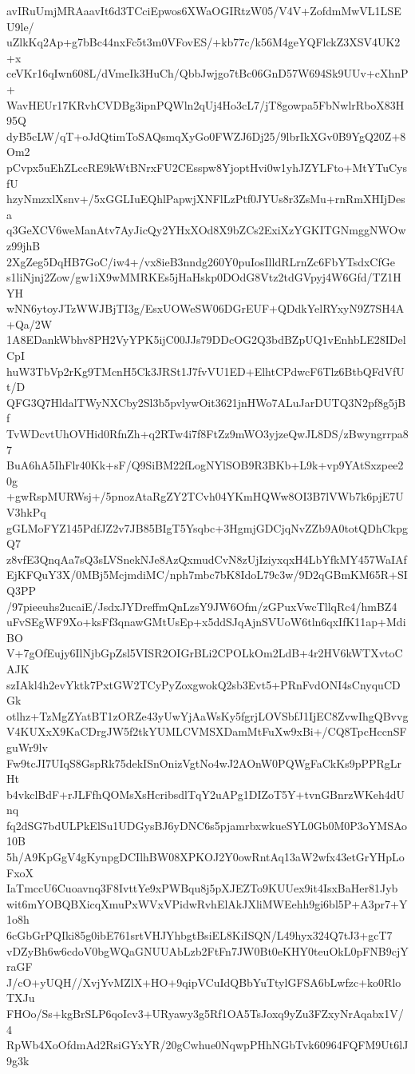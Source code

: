 avIRuUmjMRAaavIt6d3TCciEpwos6XWaOGIRtzW05/V4V+ZofdmMwVL1LSEU9le/
uZlkKq2Ap+g7bBc44nxFc5t3m0VFovES/+kb77c/k56M4geYQFlckZ3XSV4UK2+x
ceVKr16qIwn608L/dVmeIk3HuCh/QbbJwjgo7tBc06GnD57W694Sk9UUv+cXhnP+
WavHEUr17KRvhCVDBg3ipnPQWln2qUj4Ho3cL7/jT8gowpa5FbNwlrRboX83H95Q
dyB5cLW/qT+oJdQtimToSAQsmqXyGo0FWZJ6Dj25/9lbrIkXGv0B9YgQ20Z+8Om2
pCvpx5uEhZLccRE9kWtBNrxFU2CEsspw8YjoptHvi0w1yhJZYLFto+MtYTuCysfU
hzyNmzxlXsnv+/5xGGLIuEQhlPapwjXNFlLzPtf0JYUs8r3ZsMu+rnRmXHIjDesa
q3GeXCV6weManAtv7AyJicQy2YHxXOd8X9bZCs2ExiXzYGKITGNmggNWOwz99jhB
2XgZeg5DqHB7GoC/iw4+/vx8ieB3nndg260Y0puIosIlldRLrnZc6FbYTsdxCfGe
s1liNjnj2Zow/gw1iX9wMMRKEs5jHaHskp0DOdG8Vtz2tdGVpyj4W6Gfd/TZ1HYH
wNN6ytoyJTzWWJBjTI3g/EsxUOWeSW06DGrEUF+QDdkYelRYxyN9Z7SH4A+Qa/2W
1A8EDankWbhv8PH2VyYPK5ijC00JJs79DDcOG2Q3bdBZpUQ1vEnhbLE28IDelCpI
huW3TbVp2rKg9TMcnH5Ck3JRSt1J7fvVU1ED+ElhtCPdwcF6Tlz6BtbQFdVfUt/D
QFG3Q7HldalTWyNXCby2Sl3b5pvlywOit3621jnHWo7ALuJarDUTQ3N2pf8g5jBf
TvWDcvtUhOVHid0RfnZh+q2RTw4i7f8FtZz9mWO3yjzeQwJL8DS/zBwyngrrpa87
BuA6hA5IhFlr40Kk+sF/Q9SiBM22fLogNYlSOB9R3BKb+L9k+vp9YAtSxzpee20g
+gwRspMURWsj+/5pnozAtaRgZY2TCvh04YKmHQWw8OI3B7lVWb7k6pjE7UV3hkPq
gGLMoFYZ145PdfJZ2v7JB85BIgT5Ysqbc+3HgmjGDCjqNvZZb9A0totQDhCkpgQ7
z8vfE3QnqAa7sQ3sLVSnekNJe8AzQxmudCvN8zUjIziyxqxH4LbYfkMY457WaIAf
EjKFQuY3X/0MBj5McjmdiMC/nph7mbc7bK8IdoL79c3w/9D2qGBmKM65R+SIQ3PP
/97pieeuhs2ucaiE/JsdxJYDreffmQnLzsY9JW6Ofm/zGPuxVwcTllqRc4/hmBZ4
uFvSEgWF9Xo+ksFf3qnawGMtUsEp+x5ddSJqAjnSVUoW6tln6qxIfK11ap+MdiBO
V+7gOfEujy6IlNjbGpZsl5VISR2OIGrBLi2CPOLkOm2LdB+4r2HV6kWTXvtoCAJK
szIAkl4h2evYktk7PxtGW2TCyPyZoxgwokQ2sb3Evt5+PRnFvdONI4sCnyquCDGk
otlhz+TzMgZYatBT1zORZe43yUwYjAaWsKy5fgrjLOVSbfJ1IjEC8ZvwIhgQBvvg
V4KUXxX9KaCDrgJW5f2tkYUMLCVMSXDamMtFuXw9xBi+/CQ8TpcHccnSFguWr9lv
Fw9tcJI7UIqS8GspRk75dekISnOnizVgtNo4wJ2AOnW0PQWgFaCkKs9pPPRgLrHt
b4vkclBdF+rJLFfhQOMsXsHcribsdlTqY2uAPg1DIZoT5Y+tvnGBnrzWKeh4dUnq
fq2dSG7bdULPkElSu1UDGysBJ6yDNC6s5pjamrbxwkueSYL0Gb0M0P3oYMSAo10B
5h/A9KpGgV4gKynpgDCIlhBW08XPKOJ2Y0owRntAq13aW2wfx43etGrYHpLoFxoX
IaTmccU6Cuoavnq3F8IvttYe9xPWBqu8j5pXJEZTo9KUUex9it4IsxBaHer81Jyb
wit6mYOBQBXicqXmuPxWVxVPidwRvhElAkJXliMWEehh9gi6bl5P+A3pr7+Y1o8h
6cGbGrPQIki85g0ibE761srtVHJYhbgtBsiEL8KiISQN/L49hyx324Q7tJ3+gcT7
vDZyBh6w6cdoV0bgWQaGNUUAbLzb2FtFn7JW0Bt0eKHY0teuOkL0pFNB9cjYraGF
J/cO+yUQH//XvjYvMZlX+HO+9qipVCuIdQBbYuTtylGFSA6bLwfzc+ko0RloTXJu
FHOo/Ss+kgBrSLP6qoIcv3+URyawy3g5Rf1OA5TsJoxq9yZu3FZxyNrAqabx1V/4
RpWb4XoOfdmAd2RsiGYxYR/20gCwhue0NqwpPHhNGbTvk60964FQFM9Ut6lJ9g3k
